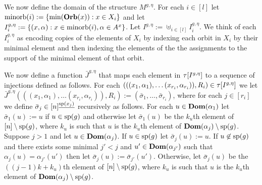 \documentclass[../main/thesis.tex]{subfiles}
\begin{document}
We now define the domain of the structure $M^{g, \eta}$. For each $i \in [l]$
let $\text{\upshape minorb}(i) := \{\min (\text{\textbf{Orb}}(x)) : x \in X_i\}$ and let $I^{g, \eta}_{i} :=
\{(x, \alpha): x \in \text{\upshape minorb}(i), \alpha \in A^x\}$. Let $I^{g, \eta} :=
\uplus_{i \in [l]} I^{g, \eta}_i$. We think of each $I^{g, \eta}_i$ as encoding
copies of the elements of $X_i$ by indexing each orbit in $X_i$ by their minimal
element and then indexing the elements of the the assignments to the support of
the minimal element of that orbit.

We now define a function $\bar{J}^{g, \eta}$ that maps each element in
$\tau[I^{g, \eta}]$ to a sequence of injections defined as follows. For
each $(((x_1, \alpha_1), \ldots (x_{r_i}, \alpha_{r_i})), R_i) \in
\tau[I^{g, \eta}]$ we let $\bar{J}^{g, \eta}(((x_1, \alpha_1), \ldots
(x_{r_i}, \alpha_{r_i})), R_i) := (\bar{\sigma}_1, \ldots, \bar{\sigma}_{r_i})$,
where for each $j \in [r_i]$ we define $\bar{\sigma}_j\in
[n]^{\underline{\text{sp}(x_j)}}$ recursively as follows. For each $u \in
\text{\textbf{Dom}}(\alpha_1)$ let $\bar{\sigma}_1(u) := u$ if $u \in \text{sp}(g)$ and otherwise
let $\bar{\sigma}_1 (u)$ be the $k_u$th element of $[n] \setminus \text{sp}(g)$,
where $k_u$ is such that $u$ is the $k_u$th element of $\text{\textbf{Dom}}(\alpha_j) \setminus
\text{sp}(g)$. Suppose $j > 1$ and let $u \in \text{\textbf{Dom}}(\alpha_j)$. If $u \in \text{sp}(g)$
let $\bar{\sigma}_j(u) := u$. If $u \not\in \text{sp}(g)$ and there exists some
minimal $j' < j$ and $u' \in \text{\textbf{Dom}} (\alpha_{j'})$ such that $\alpha_j (u) =
\alpha_{j'}(u')$ then let $\bar{\sigma}_j (u) := \bar{\sigma}_{j'}(u')$.
Otherwise, let $\bar{\sigma}_j (u)$ be the $((j - 1)k + k_u)$th element of $[n]
\setminus \text{sp}(g)$, where $k_u$ is such that $u$ is the $k_u$th element of
$\text{\textbf{Dom}}(\alpha_j) \setminus \text{sp}(g)$.
\end{document}
